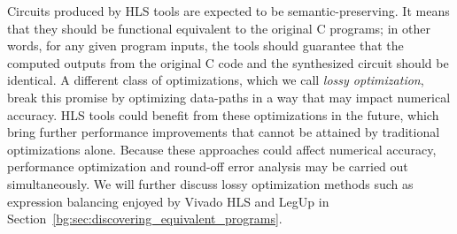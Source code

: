 Circuits produced by HLS tools are expected to be semantic-preserving.  It
means that they should be functional equivalent to the original C programs; in
other words, for any given program inputs, the tools should guarantee that the
computed outputs from the original C code and the synthesized circuit should
be identical.  A different class of optimizations, which we call \emph{lossy
optimization}, break this promise by optimizing data-paths in a way that may
impact numerical accuracy.  HLS tools could benefit from these optimizations
in the future, which bring further performance improvements that cannot
be attained by traditional optimizations alone.  Because these approaches
could affect numerical accuracy, performance optimization and round-off error
analysis may be carried out simultaneously.  We will further discuss lossy
optimization methods such as expression balancing enjoyed by Vivado HLS and
LegUp in Section~\ref{bg:sec:discovering_equivalent_programs}.
